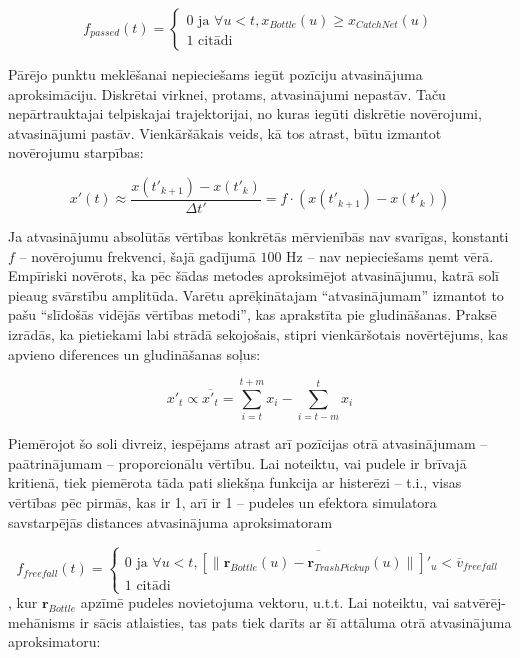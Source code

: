 \documentclass[12pt, a4paper]{article}
\numberwithin{equation}{section} %
\begin{document}
\begin{equation}
    f_{passed} (t) = \begin{cases}
        0 \text{ ja } \forall u < t, x_{Bottle}(u) \geq x_{CatchNet}(u) \\
        1 \text{ citādi }
    \end{cases}
\end{equation}

Pārējo punktu meklēšanai nepieciešams iegūt pozīciju atvasinājuma aproksimāciju. Diskrētai virknei, protams, atvasinājumi nepastāv. Taču nepārtrauktajai telpiskajai trajektorijai, no kuras iegūti diskrētie novērojumi, atvasinājumi pastāv. Vienkāršākais veids, kā tos atrast, būtu izmantot novērojumu starpības:

\begin{equation}
    x'(t) \approx \frac{x(t'_{k+1}) - x(t'_{k})}{\Delta t'} = f \cdot \left (x(t'_{k+1}) - x(t'_{k}) \right )
\end{equation}

Ja atvasinājumu absolūtās vērtības konkrētās mērvienībās nav svarīgas, konstanti $f$ -- novērojumu frekvenci, šajā gadījumā $100$ Hz -- nav nepieciešams ņemt vērā. Empīriski novērots, ka pēc šādas metodes aproksimējot atvasinājumu, katrā solī pieaug svārstību amplitūda. Varētu aprēķinātajam ``atvasinājumam'' izmantot to pašu ``slīdošās vidējās vērtības metodi'', kas aprakstīta pie gludināšanas. Praksē izrādās, ka pietiekami labi strādā sekojošais, stipri vienkāršotais novērtējums, kas apvieno diferences un gludināšanas soļus:

\begin{equation}
    x'_t \propto \overline{x'_t} = \sum_{i=t}^{t+m}  x_i - \sum_{i=t-m}^{t}  x_i
\end{equation}

Piemērojot šo soli divreiz, iespējams atrast arī pozīcijas otrā atvasinājumam -- paātrinājumam -- proporcionālu vērtību. Lai noteiktu, vai pudele ir brīvajā kritienā, tiek piemērota tāda pati sliekšņa funkcija ar histerēzi -- t.i., visas vērtības pēc pirmās, kas ir 1, arī ir 1 -- pudeles un efektora simulatora savstarpējās distances atvasinājuma aproksimatoram


\begin{equation}
    f_{freefall} (t) = \begin{cases}
        0 \text{ ja } \forall u < t,  \overline{ \left [ \lVert  \boldsymbol{r}_{Bottle}(u) -  \boldsymbol{r}_{TrashPickup}(u)  \rVert \right ] '_u} < \overline{v}_{freefall} \\
        1 \text{ citādi }
    \end{cases}
\end{equation}
, kur $ \boldsymbol{r}_{Bottle}$ apzīmē pudeles novietojuma vektoru, u.t.t. Lai noteiktu, vai satvērēj-mehānisms ir sācis atlaisties, tas pats tiek darīts ar šī attāluma otrā atvasinājuma aproksimatoru:
\end{document}
